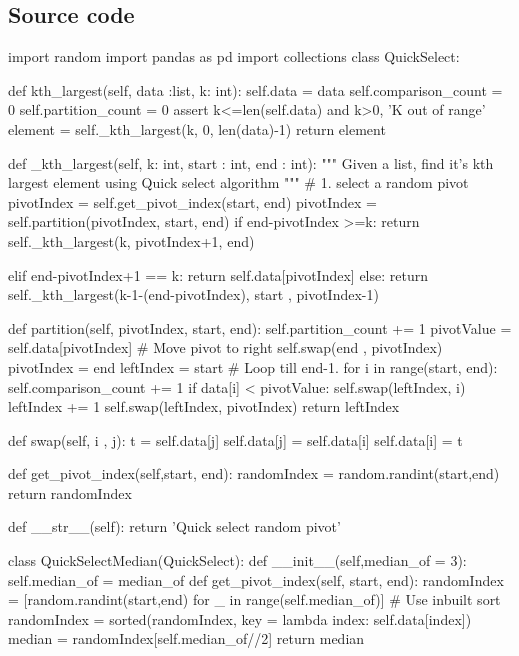 \documentclass{homeworg}
\begin{document}
\subsection{Source code}
\begin{python}

import random
import pandas as pd
import collections
class QuickSelect:

    def kth_largest(self, data :list, k: int):
        self.data = data
        self.comparison_count = 0
        self.partition_count = 0
        assert k<=len(self.data) and k>0, 'K out of range'
        element =  self._kth_largest(k, 0, len(data)-1)
        return element
    
    def _kth_largest(self, k: int, start : int, end : int):
        """
        Given a list, find it's kth largest element using Quick select algorithm
        """
        # 1. select a random pivot
        pivotIndex = self.get_pivot_index(start, end)
        pivotIndex = self.partition(pivotIndex, start, end)
        if end-pivotIndex >=k:
            return self._kth_largest(k, pivotIndex+1, end)
            
        elif end-pivotIndex+1 == k:
            return self.data[pivotIndex]
        else:
            return self._kth_largest(k-1-(end-pivotIndex), start , pivotIndex-1)

    def partition(self, pivotIndex, start, end):
        self.partition_count += 1
        pivotValue = self.data[pivotIndex]
        # Move pivot to right
        self.swap(end , pivotIndex)
        pivotIndex = end
        leftIndex = start
        # Loop till end-1.
        for i in range(start, end):
            self.comparison_count += 1
            if data[i] < pivotValue:
                self.swap(leftIndex, i)
                leftIndex += 1
        self.swap(leftIndex, pivotIndex)
        return leftIndex
    
    def swap(self, i , j):
        t = self.data[j]
        self.data[j] = self.data[i]
        self.data[i] = t

    def get_pivot_index(self,start, end):
        randomIndex = random.randint(start,end)
        return randomIndex

    def __str__(self):
        return 'Quick select random pivot'

class QuickSelectMedian(QuickSelect):
    def __init__(self,median_of = 3):
        self.median_of = median_of
    def get_pivot_index(self, start, end):
        randomIndex = [random.randint(start,end) for _ in range(self.median_of)]
        # Use inbuilt sort
        randomIndex = sorted(randomIndex, key = lambda index: self.data[index])
        median = randomIndex[self.median_of//2]
        return median


\end{python}
\end{document}
